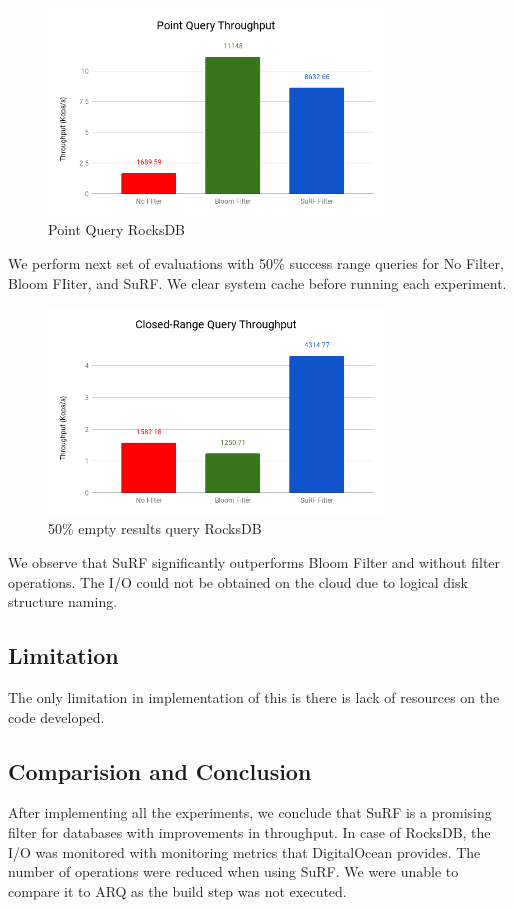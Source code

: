\documentclass[12pt,conference]{IEEEtran}
\begin{document}
\begin{figure}[H]
	\includegraphics[width=3.5in]{point}
	\caption{Point Query RocksDB}
\end{figure}

We perform next set of evaluations with 50\% success range queries for No Filter, Bloom FIiter, and SuRF. We clear system cache before running each experiment.

\begin{figure}[H]
	\includegraphics[width=3.5in]{cr}
	\caption{50\% empty results query RocksDB}
\end{figure}

We observe that SuRF significantly outperforms Bloom Filter and without filter operations. The I/O could not be obtained on the cloud due to logical disk structure naming. 


\subsection{Limitation}
The only limitation in implementation of this is there is lack of resources on the code developed.

\subsection {Comparision and Conclusion}
After implementing all the experiments, we conclude that SuRF is a promising filter for databases with improvements in throughput. In case of RocksDB, the I/O was monitored with monitoring metrics that DigitalOcean provides. The number of operations were reduced when using SuRF. We were unable to compare it to ARQ as the build step was not executed.
\end{document}
